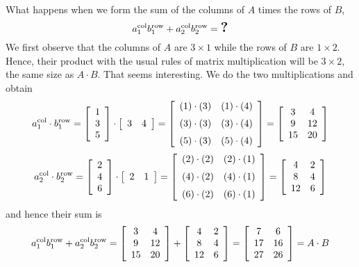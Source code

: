 What happens when we form the sum of the columns of $A$ times the rows of $B$,
$$a_1^{\rm col}  b_1^{\rm row} + a_2^{\rm col}  b_2^{\rm row} = \textbf{\Large ?}$$
We first observe that the columns of $A$ are $3 \times 1$ while the rows of $B$ are $1 \times 2$. Hence, their product with the usual rules of matrix multiplication will be $3 \times 2$, the same size as $A \cdot B$. That seems interesting. We do the two multiplications and obtain
$$
a_1^{\rm col} \cdot  b_1^{\rm row}= \left[\begin{array}{c} 1 \\
3 \\ 5 \end{array}\right] \cdot 
\left[\begin{array}{cc}3 & 4 \end{array}\right] =
\left[\begin{array}{cc} (1)\cdot (3) & (1)\cdot (4) \medskip\\
(3) \cdot (3) & (3) \cdot (4) \medskip \\ (5) \cdot (3) & (5) \cdot (4) \end{array}\right] =
\left[\begin{array}{cc} 3 & 4\\
9 & 12 \\ 15 & 20 \end{array}\right]$$
%
$$
a_2^{\rm col}  \cdot b_2^{\rm row}= 
\left[\begin{array}{c} 2 \\
4 \\ 6 \end{array}\right] \cdot 
\left[\begin{array}{cc}2 & 1 \end{array}\right] = 
\left[\begin{array}{cc} (2) \cdot (2) & (2) \cdot (1) \medskip\\
(4) \cdot (2) & (4) \cdot (1) \medskip \\ (6) \cdot (2) & (6) \cdot (1) \end{array}\right] =
\left[\begin{array}{cc} 4 & 2\\
8 & 4 \\ 12 & 6 \end{array}\right]$$
and hence their sum is
%
$$a_1^{\rm col}  b_1^{\rm row} + a_2^{\rm col}  b_2^{\rm row} = \left[\begin{array}{cc} 3 & 4\\
9 & 12 \\ 15 & 20 \end{array}\right] + \left[\begin{array}{cc} 4 & 2\\
8 & 4 \\ 12 & 6 \end{array}\right] = \left[\begin{array}{cc} 7 & 6\\
17 & 16 \\ 27 & 26 \end{array}\right]=A \cdot B$$

